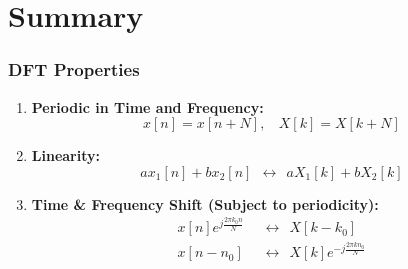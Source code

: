 \documentclass{beamer}
\begin{document}
\section[Summary]{Summary}
\setcounter{subsection}{1}

\begin{frame}
  \frametitle{DFT Properties}

  \begin{enumerate}
  \item {\bf Periodic in Time and Frequency:}
    \begin{displaymath}
      x[n]=x[n+N],~~~~X[k]=X[k+N]
    \end{displaymath}
  \item {\bf Linearity:}
    \begin{displaymath}
      ax_1[n]+bx_2[n]~~\leftrightarrow~~aX_1[k]+bX_2[k]
    \end{displaymath}
  \item {\bf Time \& Frequency Shift (Subject to periodicity):}
    \begin{align*}
      x[n]e^{j\frac{2\pi k_0 n}{N}} ~~&\leftrightarrow~~X[k-k_0]\\
      x[n-n_0] ~~&\leftrightarrow~~X[k]e^{-j\frac{2\pi kn_0}{N}}
    \end{align*}
  \end{enumerate}
\end{frame}
\end{document}
